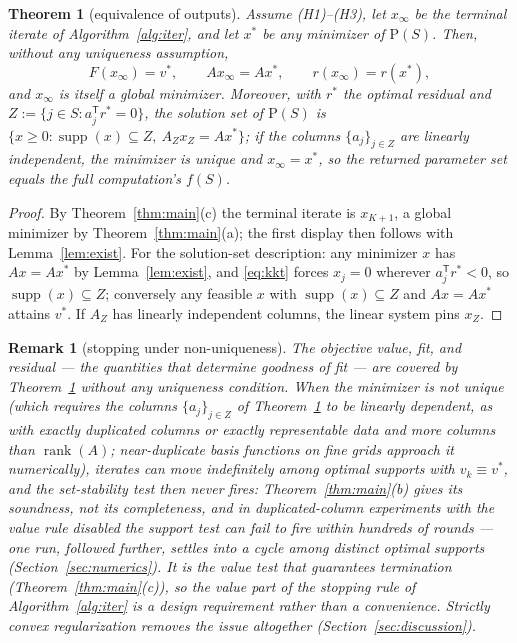 \documentclass[pdflatex,sn-mathphys-num]{sn-jnl}
\theoremstyle{thmstyleone}
\newtheorem{theorem}{Theorem}
\theoremstyle{thmstyletwo}
\newtheorem{remark}{Remark}
\newcommand{\supp}{\operatorname{supp}}
\newcommand{\T}{{\mathsf T}}
\newcommand{\prob}[1]{\mathrm{P}(#1)}
\begin{document}
\begin{theorem}[equivalence of outputs]\label{thm:outputs}
Assume \emph{(H1)--(H3)}, let $x_\infty$ be the terminal iterate of
Algorithm~\ref{alg:iter}, and let $x^*$ be any minimizer of
$\prob{S}$. Then, without any uniqueness assumption,
\begin{equation*}
F(x_\infty)=v^*,\qquad Ax_\infty=Ax^*,\qquad r(x_\infty)=r(x^*),
\end{equation*}
and $x_\infty$ is itself a global minimizer. Moreover, with $r^*$ the
optimal residual and $Z:=\{j\in S: a_j^{\T}r^*=0\}$, the solution set of
$\prob{S}$ is $\{x\ge0:\supp(x)\subseteq Z,\ A_Zx_Z=Ax^*\}$; if the
columns $\{a_j\}_{j\in Z}$ are linearly independent, the minimizer is
unique and $x_\infty=x^*$, so the returned parameter set equals the
full computation's $f(S)$.
\end{theorem}
\begin{proof}
By Theorem~\ref{thm:main}(c) the terminal iterate is $x_{K+1}$, a
global minimizer by Theorem~\ref{thm:main}(a); the first display then
follows with
Lemma~\ref{lem:exist}. For the solution-set description: any minimizer
$x$ has $Ax=Ax^*$ by Lemma~\ref{lem:exist}, and \eqref{eq:kkt} forces
$x_j=0$ wherever $a_j^{\T}r^*<0$, so $\supp(x)\subseteq Z$; conversely
any feasible $x$ with $\supp(x)\subseteq Z$ and $Ax=Ax^*$ attains $v^*$.
If $A_Z$ has linearly independent columns, the linear system pins
$x_Z$.
\end{proof}

\begin{remark}[stopping under non-uniqueness]\label{rem:stopping}
The objective value, fit, and residual --- the quantities that determine
goodness of fit --- are covered by Theorem~\ref{thm:outputs} without any
uniqueness condition. When the minimizer is not unique (which requires
the columns $\{a_j\}_{j\in Z}$ of Theorem~\ref{thm:outputs} to be
linearly dependent, as with exactly duplicated columns or exactly
representable data and more columns than $\operatorname{rank}(A)$;
near-duplicate basis functions on fine grids approach it numerically),
iterates can move
indefinitely among optimal supports with $v_k\equiv v^*$, and the
set-stability test then never fires: Theorem~\ref{thm:main}(b) gives
its soundness, not its completeness, and in duplicated-column
experiments with the value rule disabled the support test can fail to
fire within hundreds of rounds --- one run, followed further, settles
into a cycle among distinct optimal supports
(Section~\ref{sec:numerics}). It is
the value test that guarantees termination
(Theorem~\ref{thm:main}(c)), so the value part of the stopping rule of
Algorithm~\ref{alg:iter} is a design requirement rather than a
convenience. Strictly convex regularization removes the issue
altogether (Section~\ref{sec:discussion}).
\end{remark}
\end{document}
